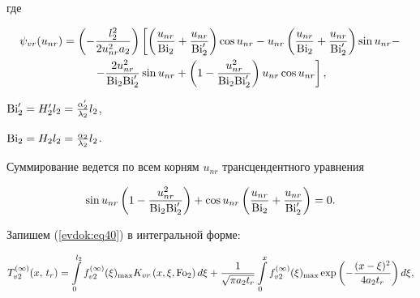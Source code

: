 \noindent

где 

\begin{multline*}

\psi _{vr} (u_{nr} ) = 

\left(  - \frac{l_2^2 }{2u_{nr}^2 a_2 }\right)

\left[ \left( \frac{u_{nr} }{{\rm Bi}_2 } + \frac{u_{nr} }{{\rm Bi}'_2} \right)

\cos  u_{nr} - u_{nr} \left( \frac{u_{nr} }{{\rm Bi}_2 } + 

\frac{u_{nr} }{{\rm Bi}'_2 } \right)\sin u_{nr} -  \right.

\\

\left.  - \frac{2u_{nr}^2 }{{\rm Bi}_2 {\rm Bi}'_2}\sin u_{nr} + 

\left(1 - \frac{ u_{nr}^2 }{{\rm Bi}_2 {\rm Bi}'_2}\right)

u_{nr} \cos u_{nr}  \right],

\end{multline*}

${\rm Bi}'_2 = H'_2 l_2 = \frac{\alpha' _2}{\lambda _2 }l_2$,

${\rm Bi}_2 = H_2 l_2 = \frac{\alpha _2 }{\lambda _2 }l_2$.

Суммирование ведется по всем корням $u_{nr} $ трансцендентного уравнения

\begin{equation}

\label{evdok:eq41}

\sin u_{nr} \left( {1 - \frac{u_{nr}^2 }{{\rm Bi}_2 {\rm Bi}'_2 }} \right) + \cos 

u_{nr} \left( {\frac{u_{nr} }{{\rm Bi}_2 } + \frac{u_{nr} }{{\rm Bi}'_2 }} \right) = 0.

\end{equation}







Запишем (\ref{evdok:eq40}) в интегральной форме:

\begin{equation}

\label{evdok:eq42}

T_{v2}^{(\infty )} (x,\,t_r ) = 

\int\limits_0^{l_2 } 

f_{v2}^{(\infty )} (\xi )_{\max } K_{vr}  

\left( x,\xi ,{\rm Fo}_2  \right)d\xi 

 + \frac{1}{\sqrt {\pi a_2 t_r } }\int\limits_0^x 

f_{v2}^{(\infty )} (\xi )_{\max }  \exp \left(  - \frac{(x - \xi 

)^2}{4a_2 t_r } \right)d\xi ,

\end{equation}

